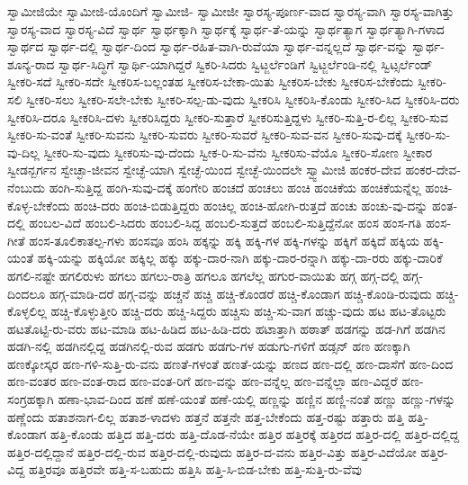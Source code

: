 {ಸ್ವಾಮೀಜಿಯೇ
ಸ್ವಾಮೀಜಿ-ಯೊಂದಿಗೆ
ಸ್ವಾಮೀಜಿ-
ಸ್ವಾಮೀಜೀ
ಸ್ವಾರಸ್ಯ-ಪೂರ್ಣ-ವಾದ
ಸ್ವಾರಸ್ಯ-ವಾಗಿ
ಸ್ವಾರಸ್ಯ-ವಾಗಿತ್ತು
ಸ್ವಾರಸ್ಯ-ವಾದ
ಸ್ವಾರಸ್ಯ-ವಿದೆ
ಸ್ವಾರ್ಥ
ಸ್ವಾರ್ಥಕ್ಕಾಗಿ
ಸ್ವಾರ್ಥಕ್ಕೆ
ಸ್ವಾರ್ಥ-ತೆ-ಯನ್ನು
ಸ್ವಾರ್ಥತ್ಯಾಗ
ಸ್ವಾರ್ಥತ್ಯಾಗಿ-ಗಳಾದ
ಸ್ವಾರ್ಥದ
ಸ್ವಾರ್ಥ-ದಲ್ಲಿ
ಸ್ವಾರ್ಥ-ದಿಂದ
ಸ್ವಾರ್ಥ-ರಹಿತ-ವಾಗಿ-ರುವೆಯಾ
ಸ್ವಾರ್ಥ-ವನ್ನಲ್ಲದೆ
ಸ್ವಾರ್ಥ-ವನ್ನು
ಸ್ವಾರ್ಥ-ಶೂನ್ಯ-ರಾದ
ಸ್ವಾರ್ಥ-ಸಿದ್ಧಿಗೆ
ಸ್ವಾರ್ಥಿ-ಯಾಗಿದ್ದರೆ
ಸ್ವಿಕರಿ-ಸಿದರು
ಸ್ವಿಟ್ಜರ್ಲೆಂಡಿಗೆ
ಸ್ವಿಟ್ಜರ್ಲೆಂಡಿ-ನಲ್ಲಿ
ಸ್ವಿಟ್ಸರ್ಲೆಂಡ್
ಸ್ವೀಕರಿ-ಸದೆ
ಸ್ವೀಕರಿ-ಸದೇ
ಸ್ವೀಕರಿಸ-ಬಲ್ಲಂತಹ
ಸ್ವೀಕರಿಸ-ಬೇಕಾ-ಯಿತು
ಸ್ವೀಕರಿಸ-ಬೇಕು
ಸ್ವೀಕರಿಸ-ಬೇಕೆಂದು
ಸ್ವೀಕರಿ-ಸಲಿ
ಸ್ವೀಕರಿ-ಸಲು
ಸ್ವೀಕರಿ-ಸಲೇ-ಬೇಕು
ಸ್ವೀಕರಿ-ಸಲ್ಪ-ಡು-ವುದು
ಸ್ವೀಕರಿಸಿ
ಸ್ವೀಕರಿಸಿ-ಕೊಂಡು
ಸ್ವೀಕರಿ-ಸಿದ
ಸ್ವೀಕರಿಸಿ-ದರು
ಸ್ವೀಕರಿಸಿ-ದರೂ
ಸ್ವೀಕರಿಸಿ-ದಳು
ಸ್ವೀಕರಿಸಿದ್ದರು
ಸ್ವೀಕರಿ-ಸುತ್ತಾರೆ
ಸ್ವೀಕರಿಸುತ್ತಿದ್ದಳು
ಸ್ವೀಕರಿ-ಸುತ್ತಿ-ರ-ಲಿಲ್ಲ
ಸ್ವೀಕರಿ-ಸುವ
ಸ್ವೀಕರಿ-ಸು-ವಂತೆ
ಸ್ವೀಕರಿ-ಸುವನು
ಸ್ವೀಕರಿ-ಸುವರು
ಸ್ವೀಕರಿ-ಸುವರೆ
ಸ್ವೀಕರಿ-ಸುವ-ವನ
ಸ್ವೀಕರಿ-ಸುವು-ದಕ್ಕೆ
ಸ್ವೀಕರಿ-ಸು-ವು-ದಿಲ್ಲ
ಸ್ವೀಕರಿ-ಸು-ವುದು
ಸ್ವೀಕರಿಸು-ವು-ದೆಂದು
ಸ್ವೀಕ-ರಿ-ಸು-ವೆನು
ಸ್ವೀಕರಿಸು-ವೆಯೊ
ಸ್ವೀಕರಿ-ಸೋಣ
ಸ್ವೀಕಾರ
ಸ್ವೀಡನ್ಬರ್ಗನ
ಸ್ವೇಚ್ಛಾ-ಜೀವನ
ಸ್ವೇಚ್ಛೆ-ಯಾಗಿ
ಸ್ವೇಚ್ಛೆ-ಯಿಂದ
ಸ್ವೇಚ್ಛೆ-ಯಿಂದಲೇ
ಸ್ವ್ವಾಮೀಜಿ
ಹಂಕರ-ದೇವ
ಹಂಕರ-ದೇವ-ನೆಂಬುದು
ಹಂಗಿ-ಸುತ್ತಿದ್ದ
ಹಂಗಿ-ಸುವು-ದಕ್ಕೆ
ಹಂಗೇರಿ
ಹಂಚದೆ
ಹಂಚಲು
ಹಂಚಿ
ಹಂಚಿಕೆಯ
ಹಂಚಿಕೆಯನ್ನೆಲ್ಲ
ಹಂಚಿ-ಕೊಳ್ಳ-ಬೇಕೆಂದು
ಹಂಚಿ-ದರು
ಹಂಚಿ-ಬಿಡುತ್ತಿದ್ದರು
ಹಂಚಿಲ್ಲ
ಹಂಚಿ-ಹೋಗಿ-ರುತ್ತದೆ
ಹಂಚು
ಹಂಚು-ವು-ದನ್ನು
ಹಂತ-ದಲ್ಲಿ
ಹಂಬಲ-ವಿದೆ
ಹಂಬಲಿ-ಸಿದರು
ಹಂಬಲಿ-ಸಿದ್ದ
ಹಂಬಲಿ-ಸುತ್ತದೆ
ಹಂಬಲಿ-ಸುತ್ತಿದ್ದೆನೋ
ಹಂಸ
ಹಂಸ-ಗತಿ
ಹಂಸ-ಗೀತೆ
ಹಂಸ-ತೂಲಿಕಾತಲ್ಪ-ಗಳು
ಹಂಸವೂ
ಹಂಸಿ
ಹಕ್ಕನ್ನು
ಹಕ್ಕಿ
ಹಕ್ಕಿ-ಗಳ
ಹಕ್ಕಿ-ಗಳನ್ನು
ಹಕ್ಕಿಗೆ
ಹಕ್ಕಿದೆ
ಹಕ್ಕಿಯ
ಹಕ್ಕಿ-ಯಂತೆ
ಹಕ್ಕಿ-ಯನ್ನು
ಹಕ್ಕಿಯೋ
ಹಕ್ಕಿಲ್ಲ
ಹಕ್ಕು
ಹಕ್ಕು-ದಾರ-ನಾಗಿ
ಹಕ್ಕು-ದಾರ-ರನ್ನಾಗಿ
ಹಕ್ಕು-ದಾ-ರರು
ಹಕ್ಕು-ದಾರಿಕೆ
ಹಗಲಿ-ನಷ್ಟೇ
ಹಗಲಿರುಳು
ಹಗಲು
ಹಗಲು-ರಾತ್ರಿ
ಹಗಲೂ
ಹಗಲೆಲ್ಲ
ಹಗುರ-ವಾಯಿತು
ಹಗ್ಗ
ಹಗ್ಗ-ದಲ್ಲಿ
ಹಗ್ಗ-ದಿಂದಲೂ
ಹಗ್ಗ-ಮಾಡಿ-ದರೆ
ಹಗ್ಗ-ವನ್ನು
ಹಚ್ಚನೆ
ಹಚ್ಚಿ
ಹಚ್ಚಿ-ಕೊಂಡರೆ
ಹಚ್ಚಿ-ಕೊಂಡಾಗ
ಹಚ್ಚಿ-ಕೊಂಡಿ-ರುವುದು
ಹಚ್ಚಿ-ಕೊಳ್ಳಲಿಲ್ಲ
ಹಚ್ಚಿ-ಕೊಳ್ಳುತ್ತೀರಿ
ಹಚ್ಚಿ-ದರು
ಹಚ್ಚಿ-ಸಿದ್ದರು
ಹಚ್ಚಿಸು
ಹಚ್ಚಿ-ಸು-ವಾಗ
ಹಚ್ಚು-ವುದು
ಹಟ
ಹಟ-ತೊಟ್ಟರು
ಹಟತೊಟ್ಟಿ-ರು-ವರು
ಹಟ-ಮಾಡಿ
ಹಟ-ಹಿಡಿದ
ಹಟ-ಹಿಡಿ-ದರು
ಹಟಾತ್ತಾಗಿ
ಹಠಾತ್
ಹಡಗನ್ನು
ಹಡ-ಗಿಗೆ
ಹಡಗಿನ
ಹಡಗಿ-ನಲ್ಲಿ
ಹಡಗಿನಲ್ಲಿದ್ದ
ಹಡಗಿನಲ್ಲಿ-ರುವ
ಹಡಗು
ಹಡಗು-ಗಳ
ಹಡುಗು-ಗಳಿಗೆ
ಹಡ್ಸನ್
ಹಣ
ಹಣಕ್ಕಾಗಿ
ಹಣಕ್ಕೋಸ್ಕರ
ಹಣ-ಗಳಿ-ಸುತ್ತಿ-ರು-ವನು
ಹಣತೆ-ಗಳಂತೆ
ಹಣತೆ-ಯನ್ನು
ಹಣದ
ಹಣ-ದಲ್ಲಿ
ಹಣ-ದಾಸೆಗೆ
ಹಣ-ದಿಂದ
ಹಣ-ವಂತರ
ಹಣ-ವಂತ-ರಾದ
ಹಣ-ವಂತ-ರಿಗೆ
ಹಣ-ವನ್ನು
ಹಣ-ವನ್ನೆಲ್ಲ
ಹಣ-ವನ್ನೆಲ್ಲಾ
ಹಣ-ವಿದ್ದರೆ
ಹಣ-ಸಂಗ್ರಹಕ್ಕಾಗಿ
ಹಣಾ-ಭಾವ-ದಿಂದ
ಹಣೆ
ಹಣೆ-ಯಂತೆ
ಹಣೆ-ಯಲ್ಲಿ
ಹಣ್ಣನ್ನು
ಹಣ್ಣಿನ
ಹಣ್ಣಿ-ನಂತೆ
ಹಣ್ಣು
ಹಣ್ಣು-ಗಳನ್ನು
ಹಣ್ಣೆಂದು
ಹತಾಶನಾಗ-ಲಿಲ್ಲ
ಹತಾಶ-ಳಾದಳು
ಹತ್ತನೆ
ಹತ್ತನೇ
ಹತ್ತ-ಬೇಕೆಂದು
ಹತ್ತ-ರಷ್ಟು
ಹತ್ತಾರು
ಹತ್ತಿ
ಹತ್ತಿ-ಕೊಂಡಾಗ
ಹತ್ತಿ-ಕೊಂಡು
ಹತ್ತಿದ
ಹತ್ತಿ-ದರು
ಹತ್ತಿ-ದೊಡ-ನೆಯೇ
ಹತ್ತಿರ
ಹತ್ತಿರಕ್ಕೆ
ಹತ್ತಿರದ
ಹತ್ತಿರ-ದಲ್ಲಿ
ಹತ್ತಿರ-ದಲ್ಲಿದ್ದ
ಹತ್ತಿರ-ದಲ್ಲಿದ್ದಾನೆ
ಹತ್ತಿರ-ದಲ್ಲಿ-ರುವ
ಹತ್ತಿರ-ದಲ್ಲಿ-ರುವುದು
ಹತ್ತಿರ-ದ-ವನು
ಹತ್ತಿರ-ವಿತ್ತು
ಹತ್ತಿರ-ವಿದೆಯೋ
ಹತ್ತಿರ-ವಿದ್ದ
ಹತ್ತಿರವೂ
ಹತ್ತಿರವೇ
ಹತ್ತಿ-ಸ-ಬಹುದು
ಹತ್ತಿಸಿ
ಹತ್ತಿ-ಸಿ-ಬಿಡ-ಬೇಕು
ಹತ್ತಿ-ಸುತ್ತಿ-ರು-ವೆವು
}

